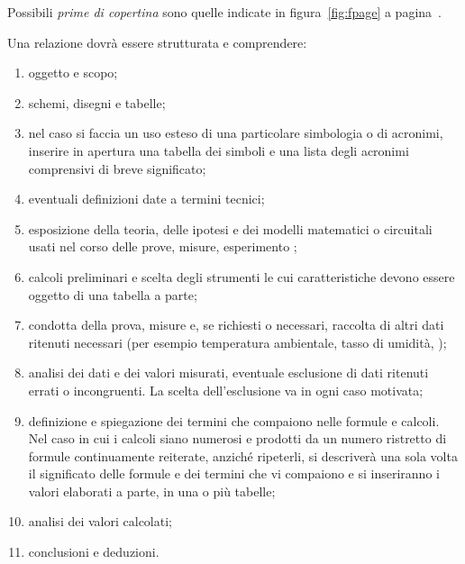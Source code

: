 Possibili \textit{prime di copertina} sono quelle indicate in figura~\ref{fig:fpage} a pagina~\pageref{fig:fpage}.

Una relazione dovrà essere strutturata e comprendere:
\begin{enumerate}
 \item oggetto e scopo;
 \item schemi, disegni e tabelle;
 \item nel caso si faccia un uso esteso di una particolare simbologia o di acronimi, inserire in apertura una tabella dei simboli e una lista degli acronimi comprensivi di breve significato;
 \item eventuali definizioni date a termini tecnici;
 \item esposizione della teoria, delle ipotesi e dei modelli matematici o circuitali usati nel corso delle prove, misure, esperimento \ecc;
 \item calcoli preliminari e scelta degli strumenti le cui caratteristiche devono essere oggetto di una tabella a parte;
 \item condotta della prova, misure e, se richiesti o necessari, raccolta di altri dati ritenuti necessari (per esempio temperatura ambientale, tasso di umidità, \ecc);
 \item analisi dei dati e dei valori misurati, eventuale esclusione di dati ritenuti errati o incongruenti. La scelta dell'esclusione va in ogni caso motivata;
 \item definizione e spiegazione dei termini che compaiono nelle formule e calcoli. Nel caso in cui i calcoli siano numerosi e prodotti da un numero ristretto di formule continuamente reiterate, anziché ripeterli, si descriverà una sola volta il significato delle formule e dei termini che vi compaiono e si inseriranno i valori elaborati a parte, in una o più tabelle;
 \item analisi dei valori calcolati;
 \item conclusioni e deduzioni.
\end{enumerate}

